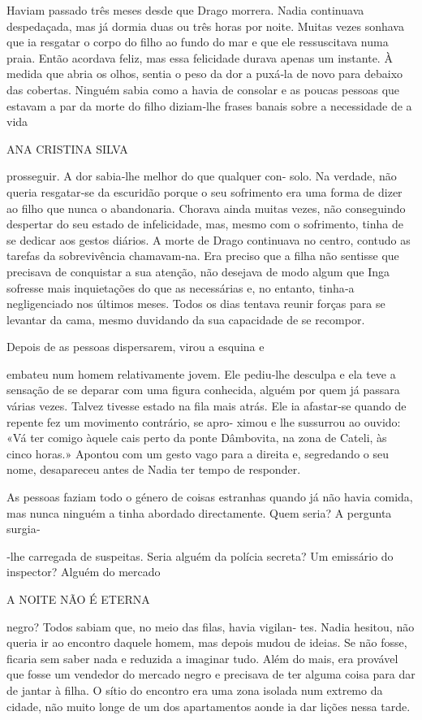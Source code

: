Haviam passado três meses desde que Drago morrera. Nadia continuava
despedaçada, mas já dormia duas ou três horas por noite. Muitas vezes
sonhava que ia resgatar o corpo do filho ao fundo do mar e que ele
ressuscitava numa praia. Então acordava feliz, mas essa felicidade
durava apenas um instante. À medida que abria os olhos, sentia o peso da
dor a puxá‑la de novo para debaixo das cobertas. Ninguém sabia como a
havia de consolar e as poucas pessoas que estavam a par da morte do
filho diziam‑lhe frases banais sobre a necessidade de a vida

ANA CRISTINA SILVA

prosseguir. A dor sabia‑lhe melhor do que qualquer con‑ solo. Na
verdade, não queria resgatar‑se da escuridão porque o seu sofrimento era
uma forma de dizer ao filho que nunca o abandonaria. Chorava ainda
muitas vezes, não conseguindo despertar do seu estado de infelicidade,
mas, mesmo com o sofrimento, tinha de se dedicar aos gestos diários. A
morte de Drago continuava no centro, contudo as tarefas da sobrevivência
chamavam‑na. Era preciso que a filha não sentisse que precisava de
conquistar a sua atenção, não desejava de modo algum que Inga sofresse
mais inquietações do que as necessárias e, no entanto, tinha‑a
negligenciado nos últimos meses. Todos os dias tentava reunir forças
para se levantar da cama, mesmo duvidando da sua capacidade de se
recompor.

Depois de as pessoas dispersarem, virou a esquina e

embateu num homem relativamente jovem. Ele pediu‑lhe desculpa e ela teve
a sensação de se deparar com uma figura conhecida, alguém por quem já
passara várias vezes. Talvez tivesse estado na fila mais atrás. Ele ia
afastar‑se quando de repente fez um movimento contrário, se apro‑ ximou
e lhe sussurrou ao ouvido: «Vá ter comigo àquele cais perto da ponte
Dâmbovita, na zona de Cateli, às cinco horas.» Apontou com um gesto vago
para a direita e, segredando o seu nome, desapareceu antes de Nadia ter
tempo de responder.

As pessoas faziam todo o género de coisas estranhas quando já não havia
comida, mas nunca ninguém a tinha abordado directamente. Quem seria? A
pergunta surgia‑

‑lhe carregada de suspeitas. Seria alguém da polícia secreta? Um
emissário do inspector? Alguém do mercado

A NOITE NÃO É ETERNA

negro? Todos sabiam que, no meio das filas, havia vigilan‑ tes. Nadia
hesitou, não queria ir ao encontro daquele homem, mas depois mudou de
ideias. Se não fosse, ficaria sem saber nada e reduzida a imaginar tudo.
Além do mais, era provável que fosse um vendedor do mercado negro e
precisava de ter alguma coisa para dar de jantar à filha. O sítio do
encontro era uma zona isolada num extremo da cidade, não muito longe de
um dos apartamentos aonde ia dar lições nessa tarde.

